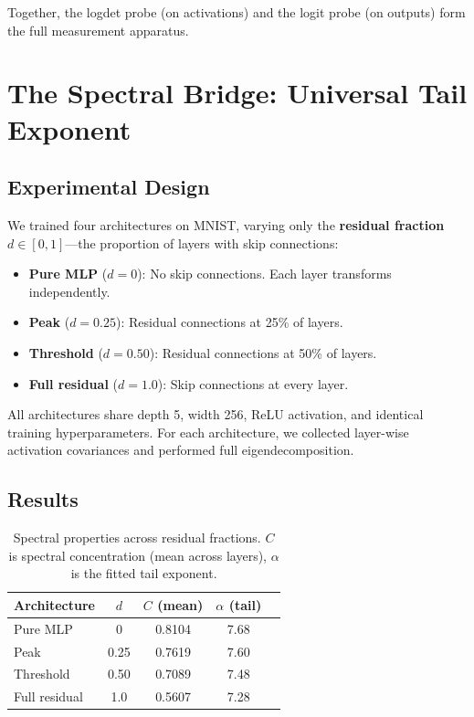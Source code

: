 \documentclass[12pt,a4paper]{article}
\begin{document}
Together, the logdet probe (on activations) and the logit probe (on outputs) form the full measurement apparatus.

\section{The Spectral Bridge: Universal Tail Exponent}
\label{sec:spectral}

\subsection{Experimental Design}

We trained four architectures on MNIST, varying only the \textbf{residual fraction} $d \in [0, 1]$---the proportion of layers with skip connections:

\begin{itemize}
    \item \textbf{Pure MLP} ($d = 0$): No skip connections. Each layer transforms independently.
    \item \textbf{Peak} ($d = 0.25$): Residual connections at 25\% of layers.
    \item \textbf{Threshold} ($d = 0.50$): Residual connections at 50\% of layers.
    \item \textbf{Full residual} ($d = 1.0$): Skip connections at every layer.
\end{itemize}

All architectures share depth 5, width 256, ReLU activation, and identical training hyperparameters. For each architecture, we collected layer-wise activation covariances and performed full eigendecomposition.

\subsection{Results}

\begin{table}[h]
\centering
\caption{Spectral properties across residual fractions. $C$ is spectral concentration (mean across layers), $\alpha$ is the fitted tail exponent.}
\label{tab:spectral}
\begin{tabular}{lcccc}
\toprule
Architecture & $d$ & $C$ (mean) & $\alpha$ (tail) \\
\midrule
Pure MLP & 0 & 0.8104 & 7.68 \\
Peak & 0.25 & 0.7619 & 7.60 \\
Threshold & 0.50 & 0.7089 & 7.48 \\
Full residual & 1.0 & 0.5607 & 7.28 \\
\bottomrule
\end{tabular}
\end{table}
\end{document}
